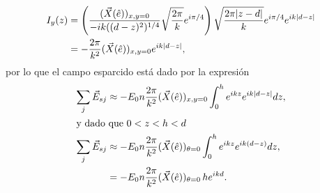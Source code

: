 \documentclass[letterpaper, 12pt] {article}
\begin{document}
\begin{align}
I_y (z) &= \left( \frac{(\vec{X}(\hat{e}))_{x,y=0} }{-ik ((d-z)^2)^{1/4}} \sqrt{\frac{2\pi}{k}} e^{i\pi/4} \right) \sqrt{\frac{2\pi |z-d|}{k}}e^{i\pi/4}e^{ik|d-z|}  \notag \\
	&= - \frac{2\pi}{k^2} (\vec{X}(\hat{e}))_{x,y=0} e^{ik|d-z|}, \label{eq:Iy}
\end{align}
por lo que el campo esparcido está dado por la expresión
\begin{align}
\sum_j \vec{E}_{sj} &\approx - E_0 n  \frac{2\pi}{k^2} (\vec{X}(\hat{e}))_{x,y=0}
					\int_0^h e^{ikz}  e^{ik|d-z|} dz,\\
\intertext{y dado que $0<z<h<d$}				
\sum_j \vec{E}_{sj} &\approx - E_0 n  \frac{2\pi}{k^2} (\vec{X}
					(\hat{e}))_{\theta=0} \int_0^h e^{ikz}  e^{ik(d-z)} dz,\\	
					&= - E_0 n  \frac{2\pi}{k^2} (\vec{X}
					(\hat{e}))_{\theta=0} \,h e^{ikd}.\label{eq:Es_delante}
\end{align}
\end{document}
